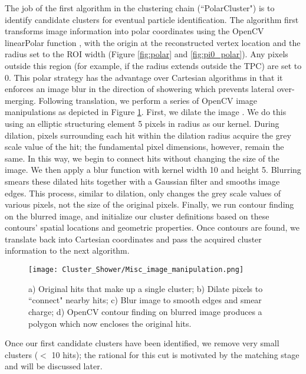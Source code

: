 \par The job of the first algorithm in the clustering chain (``PolarCluster") is to identify candidate clusters for eventual particle identification. The algorithm first transforms image information into polar coordinates using the OpenCV linearPolar function \cite{bib:linearPolar}, with the origin at the reconstructed vertex location and the radius set to the ROI width (Figure \ref{fig:polar} and \ref{fig:pi0_polar}). Any pixels outside this region (for example, if the radius extends outside the TPC) are set to 0. This polar strategy has the advantage over Cartesian algorithms in that it enforces an image blur in the direction of showering which prevents lateral over-merging. Following translation, we perform a series of OpenCV image manipulations as depicted in Figure \ref{fig:sbc}. First, we dilate the image \cite{bib:dilate}. We do this using an elliptic structuring element \cite{bib:structuringElement} 5 pixels in radius as our kernel. During dilation, pixels surrounding each hit within the dilation radius acquire the grey scale value of the hit; the fundamental pixel dimensions, however, remain the same. In this way, we begin to connect hits without changing the size of the image. We then apply a blur function \cite{bib:blur} with kernel width 10 and height 5. Blurring smears these dilated hits together with a Gaussian filter and smooths image edges. This process, similar to dilation, only changes the grey scale values of various pixels, not the size of the original pixels. Finally, we run contour finding \cite{bib:contourFinding} on the blurred image, and initialize our cluster definitions based on these contours' spatial locations and geometric properties.  Once contours are found, we translate back into Cartesian coordinates and pass the acquired cluster information to the next algorithm.

\begin{figure}[H]
\centering
\texttt{[image: Cluster\_Shower/Misc\_image\_manipulation.png]}
\caption{ a) Original hits that make up a single cluster; b) Dilate pixels to ``connect" nearby hits; c) Blur image to smooth edges and smear charge; d) OpenCV contour finding on blurred image produces a polygon which now encloses the original hits.}
\label{fig:sbc}
\end{figure}

\par Once our first candidate clusters have been identified, we remove very small clusters ($<$ 10 hits); the rational for this cut is motivated by the matching stage and will be discussed later.  

